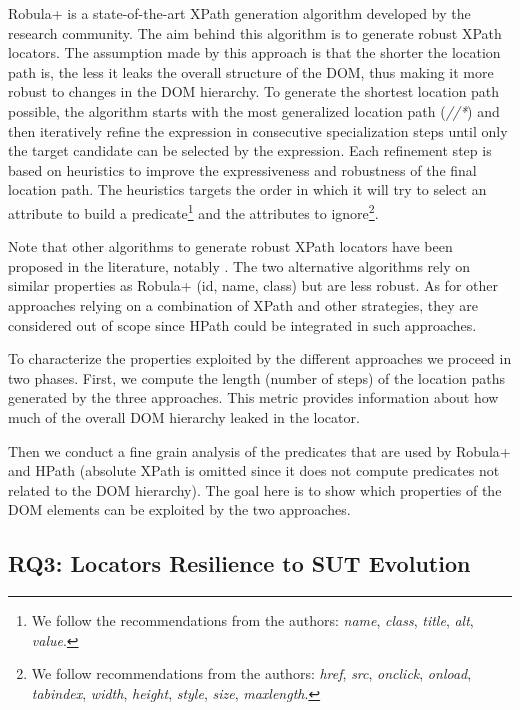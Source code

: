 Robula+\cite{Leotta2016} is a state-of-the-art XPath generation algorithm developed by the research community. The aim behind this algorithm is to generate robust XPath locators. The assumption made by this approach is that the shorter the location path is, the less it leaks the overall structure of the DOM, thus making it more robust to changes in the DOM hierarchy. To generate the shortest location path possible, the algorithm starts with the most generalized location path (\emph{//*}) and then iteratively refine the expression in consecutive specialization steps until only the target candidate can be selected by the expression. Each refinement step is based on heuristics to improve the expressiveness and robustness of the final location path. The heuristics targets the order in which it will try to select an attribute to build a predicate\footnote{We follow the recommendations from the authors: \emph{name}, \emph{class}, \emph{title}, \emph{alt}, \emph{value}.} and the attributes to ignore\footnote{We follow recommendations from the authors: \emph{href}, \emph{src}, \emph{onclick}, \emph{onload}, \emph{tabindex}, \emph{width}, \emph{height}, \emph{style}, \emph{size}, \emph{maxlength}.}.

Note that other algorithms to generate robust XPath locators have been proposed in the literature, notably \textcite{Montoto2011, Thummalapenta2013}. The two alternative algorithms rely on similar properties as Robula+ (id, name, class) but are less robust\cite{Leotta2016}. As for other approaches relying on a combination of XPath and other strategies\cite{Leotta2015, Aldalur2017}, they are considered out of scope since HPath could be integrated in such approaches.

To characterize the properties exploited by the different approaches we proceed in two phases. First, we compute the length (number of steps) of the location paths generated by the three approaches. This metric provides information about how much of the overall DOM hierarchy leaked in the locator.

Then we conduct a fine grain analysis of the predicates that are used by Robula+ and HPath (absolute XPath is omitted since it does not compute predicates not related to the DOM hierarchy). The goal here is to show which properties of the DOM elements can be exploited by the two approaches.

\subsection{RQ3: Locators Resilience to SUT Evolution}
\label{sec:hpath-protocol-rq3}

